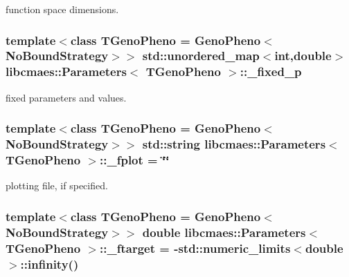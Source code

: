 function space dimensions. \hypertarget{classlibcmaes_1_1Parameters_a83fdae9d4bb9b77c8ad955c6aac75086}{
\subsubsection[{\-\_\-fixed\-\_\-p}]{\setlength{\rightskip}{0pt plus 5cm}template$<$class T\-Geno\-Pheno = Geno\-Pheno$<$\-No\-Bound\-Strategy$>$$>$ std\-::unordered\-\_\-map$<$int,double$>$ {\bf libcmaes\-::\-Parameters}$<$ T\-Geno\-Pheno $>$\-::\-\_\-fixed\-\_\-p\hspace{0.3cm}{\ttfamily [protected]}}}\label{classlibcmaes_1_1Parameters_a83fdae9d4bb9b77c8ad955c6aac75086}
fixed parameters and values. \hypertarget{classlibcmaes_1_1Parameters_aa49511ea00199348ea94f1aa53fe5bc1}{
\subsubsection[{\-\_\-fplot}]{\setlength{\rightskip}{0pt plus 5cm}template$<$class T\-Geno\-Pheno = Geno\-Pheno$<$\-No\-Bound\-Strategy$>$$>$ std\-::string {\bf libcmaes\-::\-Parameters}$<$ T\-Geno\-Pheno $>$\-::\-\_\-fplot = \char`\"{}\char`\"{}\hspace{0.3cm}{\ttfamily [protected]}}}\label{classlibcmaes_1_1Parameters_aa49511ea00199348ea94f1aa53fe5bc1}
plotting file, if specified. \hypertarget{classlibcmaes_1_1Parameters_a837dbcfba351a043441076a11666f92c}{
\subsubsection[{\-\_\-ftarget}]{\setlength{\rightskip}{0pt plus 5cm}template$<$class T\-Geno\-Pheno = Geno\-Pheno$<$\-No\-Bound\-Strategy$>$$>$ double {\bf libcmaes\-::\-Parameters}$<$ T\-Geno\-Pheno $>$\-::\-\_\-ftarget = -\/std\-::numeric\-\_\-limits$<$double$>$\-::infinity()\hspace{0.3cm}{\ttfamily [protected]}}}\label{classlibcmaes_1_1Parameters_a837dbcfba351a043441076a11666f92c}
